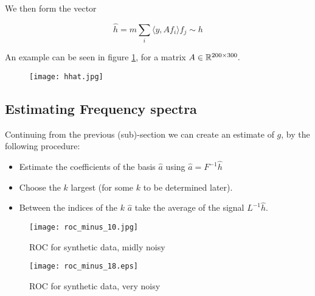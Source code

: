 We then form the vector 

\begin{equation}
\hat{h} = m \sum_i \langle y, Af_i\rangle f_j \sim h
\label{ss-estimator}
\end{equation}

An example can be seen in figure \ref{fig:hhat}, for a matrix \(A \in {\mathbb{R}}^{200 \times 300}.\)

\begin{figure}[h]
\centering
\texttt{[image: hhat.jpg]}
\caption{}
\label{fig:hhat}
\end{figure}

\subsection{Estimating Frequency spectra}

Continuing from the previous (sub)-section we can create an estimate of \(g\), by the following procedure:

\begin{itemize}
\item Estimate the coefficients of the basis \(\hat{a}\) using \(\hat{a} = F^{-1} \hat{h}\)
\item Choose the \(k\) largest (for some \(k\) to be determined later).
\item Between the indices of the \(k\) \(\hat{a}\) take the average of the signal \(L^{-1}\hat{h}\).
\end{itemize}


\begin{figure}[h]
\centering
\texttt{[image: roc\_minus\_10.jpg]}
\caption{ROC for synthetic data, midly noisy}
\label{fig:hvb}
\end{figure}

\begin{figure}[h]
\centering
\texttt{[image: roc\_minus\_18.eps]}
\caption{ROC for synthetic data, very noisy}
\label{fig:hvb}
\end{figure}